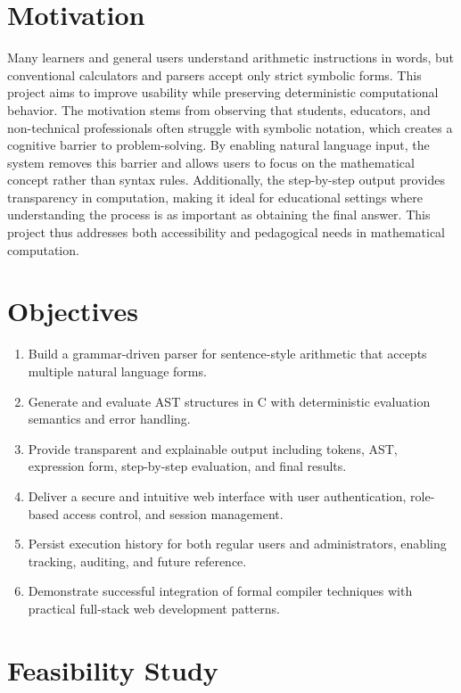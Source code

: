\documentclass[12pt,a4paper]{report}
\begin{document}
\section{Motivation}
Many learners and general users understand arithmetic instructions in words, but conventional
calculators and parsers accept only strict symbolic forms. This project aims to improve usability
while preserving deterministic computational behavior. The motivation stems from observing that students, educators, and
non-technical professionals often struggle with symbolic notation, which creates a cognitive barrier to problem-solving.
By enabling natural language input, the system removes this barrier and allows users to focus on the mathematical
concept rather than syntax rules. Additionally, the step-by-step output provides transparency in computation, making it
ideal for educational settings where understanding the process is as important as obtaining the final answer.
This project thus addresses both accessibility and pedagogical needs in mathematical computation.

\section{Objectives}

\begin{enumerate}
\item Build a grammar-driven parser for sentence-style arithmetic that accepts multiple natural language forms.
\item Generate and evaluate AST structures in C with deterministic evaluation semantics and error handling.
\item Provide transparent and explainable output including tokens, AST, expression form, step-by-step evaluation, and final results.
\item Deliver a secure and intuitive web interface with user authentication, role-based access control, and session management.
\item Persist execution history for both regular users and administrators, enabling tracking, auditing, and future reference.
\item Demonstrate successful integration of formal compiler techniques with practical full-stack web development patterns.
\end{enumerate}

\section{Feasibility Study}
\end{document}
